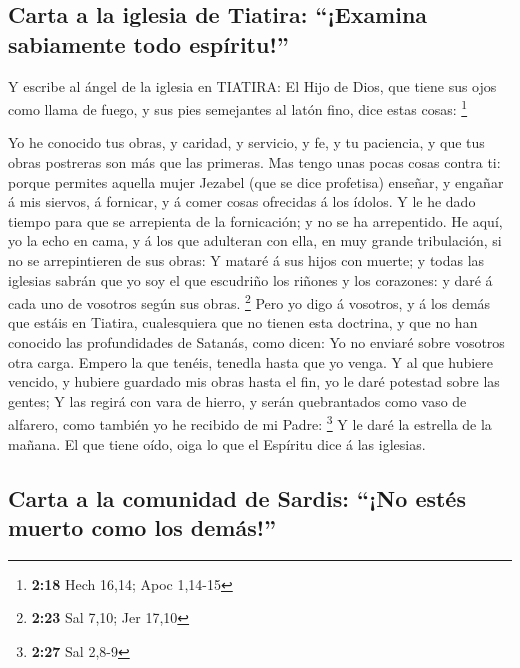 \hypertarget{carta-a-la-iglesia-de-tiatira-examina-sabiamente-todo-espuxedritu}{%
\subsection{Carta a la iglesia de Tiatira: ``¡Examina sabiamente todo
espíritu!''}\label{carta-a-la-iglesia-de-tiatira-examina-sabiamente-todo-espuxedritu}}

 Y escribe al ángel de la iglesia en TIATIRA: El Hijo de
Dios, que tiene sus ojos como llama de fuego, y sus pies semejantes al
latón fino, dice estas cosas: \footnote{\textbf{2:18} Hech 16,14; Apoc
  1,14-15}

 Yo he conocido tus obras, y caridad, y servicio, y fe, y
tu paciencia, y que tus obras postreras son más que las primeras.
 Mas tengo unas pocas cosas contra ti: porque permites
aquella mujer Jezabel (que se dice profetisa) enseñar, y engañar á mis
siervos, á fornicar, y á comer cosas ofrecidas á los ídolos.
 Y le he dado tiempo para que se arrepienta de la
fornicación; y no se ha arrepentido.  He aquí, yo la echo
en cama, y á los que adulteran con ella, en muy grande tribulación, si
no se arrepintieren de sus obras:  Y mataré á sus hijos
con muerte; y todas las iglesias sabrán que yo soy el que escudriño los
riñones y los corazones: y daré á cada uno de vosotros según sus obras.
\footnote{\textbf{2:23} Sal 7,10; Jer 17,10}  Pero yo
digo á vosotros, y á los demás que estáis en Tiatira, cualesquiera que
no tienen esta doctrina, y que no han conocido las profundidades de
Satanás, como dicen: Yo no enviaré sobre vosotros otra carga.
 Empero la que tenéis, tenedla hasta que yo venga.
 Y al que hubiere vencido, y hubiere guardado mis obras
hasta el fin, yo le daré potestad sobre las gentes;  Y
las regirá con vara de hierro, y serán quebrantados como vaso de
alfarero, como también yo he recibido de mi Padre: \footnote{\textbf{2:27}
  Sal 2,8-9}  Y le daré la estrella de la mañana.
 El que tiene oído, oiga lo que el Espíritu dice á las
iglesias.

\hypertarget{carta-a-la-comunidad-de-sardis-no-estuxe9s-muerto-como-los-demuxe1s}{%
\subsection{Carta a la comunidad de Sardis: ``¡No estés muerto como los
demás!''}\label{carta-a-la-comunidad-de-sardis-no-estuxe9s-muerto-como-los-demuxe1s}}

